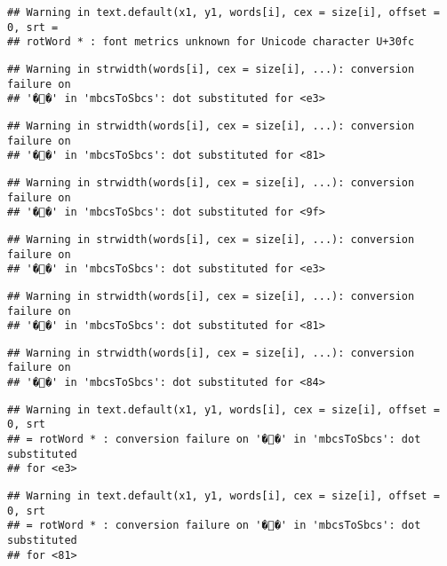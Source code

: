 \documentclass[]{article}
\begin{document}
\begin{verbatim}
## Warning in text.default(x1, y1, words[i], cex = size[i], offset = 0, srt =
## rotWord * : font metrics unknown for Unicode character U+30fc
\end{verbatim}

\begin{verbatim}
## Warning in strwidth(words[i], cex = size[i], ...): conversion failure on
## '��' in 'mbcsToSbcs': dot substituted for <e3>
\end{verbatim}

\begin{verbatim}
## Warning in strwidth(words[i], cex = size[i], ...): conversion failure on
## '��' in 'mbcsToSbcs': dot substituted for <81>
\end{verbatim}

\begin{verbatim}
## Warning in strwidth(words[i], cex = size[i], ...): conversion failure on
## '��' in 'mbcsToSbcs': dot substituted for <9f>
\end{verbatim}

\begin{verbatim}
## Warning in strwidth(words[i], cex = size[i], ...): conversion failure on
## '��' in 'mbcsToSbcs': dot substituted for <e3>
\end{verbatim}

\begin{verbatim}
## Warning in strwidth(words[i], cex = size[i], ...): conversion failure on
## '��' in 'mbcsToSbcs': dot substituted for <81>
\end{verbatim}

\begin{verbatim}
## Warning in strwidth(words[i], cex = size[i], ...): conversion failure on
## '��' in 'mbcsToSbcs': dot substituted for <84>
\end{verbatim}

\begin{verbatim}
## Warning in text.default(x1, y1, words[i], cex = size[i], offset = 0, srt
## = rotWord * : conversion failure on '��' in 'mbcsToSbcs': dot substituted
## for <e3>
\end{verbatim}

\begin{verbatim}
## Warning in text.default(x1, y1, words[i], cex = size[i], offset = 0, srt
## = rotWord * : conversion failure on '��' in 'mbcsToSbcs': dot substituted
## for <81>
\end{verbatim}
\end{document}
